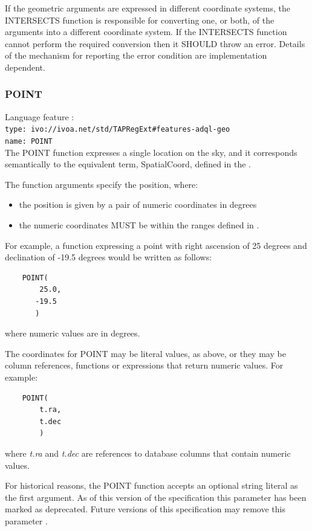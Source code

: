 \documentclass[11pt,a4paper]{ivoa}
\begin{document}
If the geometric arguments are expressed in different coordinate systems,
the INTERSECTS function is responsible for converting one, or both, of the
arguments into a different coordinate system.
If the INTERSECTS function cannot perform the required conversion then
it SHOULD throw an error.
Details of the mechanism for reporting the error condition are
implementation dependent.

\subsubsection{POINT}
\label{sec:functions.geom.point}
{\footnotesize Language feature :}\\
{\footnotesize \verb|type: ivo://ivoa.net/std/TAPRegExt#features-adql-geo|}\\
{\footnotesize \verb|name: POINT|}\\

The POINT function expresses a single location on the sky,
and it corresponds semantically to the equivalent term, SpatialCoord, defined in
the \STCSpec{}.

The function arguments specify the position, where:
\begin{itemize}
    \item the position is given by a pair of numeric coordinates in degrees
    \item the numeric coordinates MUST be within the ranges defined in
    .
\end{itemize}

For example, a function expressing a point with right ascension of 25 degrees
and declination of -19.5 degrees would be written as follows:
\begin{verbatim}
    POINT(
        25.0,
       -19.5
       )
\end{verbatim}
\noindent
where numeric values are in degrees.

The coordinates for POINT may be literal values, as above,
or they may be column references, functions or expressions that return
numeric values.
For example:
\begin{verbatim}
    POINT(
        t.ra,
        t.dec
        )
\end{verbatim}
\noindent
where \textit{t.ra} and \textit{t.dec} are references to database
columns that contain numeric values.

For historical reasons, the POINT function accepts an optional string literal
as the first argument.
As of this version of the specification this parameter has been
marked as deprecated.
Future versions of this specification may remove this parameter
.
\end{document}
